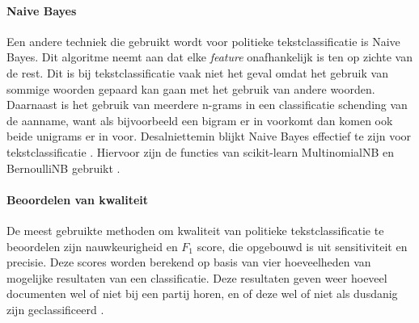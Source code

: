 \paragraph{Naive Bayes}
Een andere techniek die gebruikt wordt voor politieke tekstclassificatie is Naive Bayes. Dit algoritme neemt aan dat elke \textit{feature} onafhankelijk is ten op zichte van de rest. Dit is bij tekstclassificatie vaak niet het geval omdat het gebruik van sommige woorden gepaard kan gaan met het gebruik van andere woorden. Daarnaast is het gebruik van meerdere n-grams in een classificatie schending van de aanname, want als bijvoorbeeld een bigram er in voorkomt dan komen ook beide unigrams er in voor. Desalniettemin blijkt Naive Bayes effectief te zijn voor tekstclassificatie \cite{bhand,scikit-learn}. Hiervoor zijn de functies van scikit-learn MultinomialNB en BernoulliNB gebruikt \cite{bhand,scikit-learn}.\par

\paragraph{Beoordelen van kwaliteit}
De meest gebruikte methoden om kwaliteit van politieke tekstclassificatie te beoordelen zijn nauwkeurigheid en $F_1$ score, die opgebouwd is uit sensitiviteit en precisie. Deze scores worden berekend op basis van vier hoeveelheden van mogelijke resultaten van een classificatie. Deze resultaten geven weer hoeveel documenten wel of niet bij een partij horen, en of deze wel of niet als dusdanig zijn geclassificeerd \cite{Manning:2008:IIR:1394399} .\par

